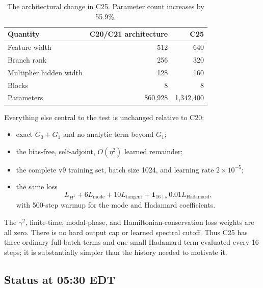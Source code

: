 \documentclass[11pt]{article}
\begin{document}
\begin{table}[htbp]
\centering
\begin{tabular}{lrr}
\toprule
Quantity & C20/C21 architecture & C25 \\
\midrule
Feature width & 512 & 640 \\
Branch rank & 256 & 320 \\
Multiplier hidden width & 128 & 160 \\
Blocks & 8 & 8 \\
Parameters & 860,928 & 1,342,400 \\
\bottomrule
\end{tabular}
\caption{The architectural change in C25.  Parameter count increases by
55.9\%.}
\label{tab:c25-size}
\end{table}

Everything else central to the test is unchanged relative to C20:
\begin{itemize}[leftmargin=*]
  \item exact $G_0+G_1$ and no analytic term beyond $G_1$;
  \item the bias-free, self-adjoint, $O(\eta^2)$ learned remainder;
  \item the complete v9 training set, batch size 1024, and learning rate
  $2\times10^{-5}$;
  \item the same loss
  \begin{equation}
    L_{H^1}+6L_{\mathrm{mode}}+10L_{\mathrm{tangent}}
    +\mathbf 1_{16\mid s}\,0.01L_{\mathrm{Hadamard}},
    \label{eq:c25-loss}
  \end{equation}
  with 500-step warmup for the mode and Hadamard coefficients.
\end{itemize}
The $\gamma^2$, finite-time, modal-phase, and Hamiltonian-conservation loss
weights are all zero.  There is no hard output cap or learned spectral cutoff.
Thus C25 has three ordinary full-batch terms and one small Hadamard term
evaluated every 16 steps; it is substantially simpler than the history needed
to motivate it.

\subsection{Status at 05:30 EDT}
\end{document}
